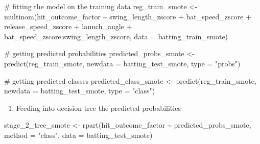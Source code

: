 \documentclass[
  letterpaper,
  DIV=11,
  numbers=noendperiod]{scrartcl}
\newenvironment{Shaded}{\begin{snugshade}}{\end{snugshade}}
\newcommand{\AttributeTok}[1]{\textcolor[rgb]{0.40,0.45,0.13}{#1}}
\newcommand{\CommentTok}[1]{\textcolor[rgb]{0.37,0.37,0.37}{#1}}
\newcommand{\FunctionTok}[1]{\textcolor[rgb]{0.28,0.35,0.67}{#1}}
\newcommand{\NormalTok}[1]{\textcolor[rgb]{0.00,0.23,0.31}{#1}}
\newcommand{\OtherTok}[1]{\textcolor[rgb]{0.00,0.23,0.31}{#1}}
\newcommand{\SpecialCharTok}[1]{\textcolor[rgb]{0.37,0.37,0.37}{#1}}
\newcommand{\StringTok}[1]{\textcolor[rgb]{0.13,0.47,0.30}{#1}}
\providecommand{\tightlist}{%
  \setlength{\itemsep}{0pt}\setlength{\parskip}{0pt}}\usepackage{longtable,booktabs,array}
\begin{document}
\begin{Shaded}
\begin{Highlighting}[]
\CommentTok{\# fitting the model on the training data }
\NormalTok{reg\_train\_smote }\OtherTok{\textless{}{-}} \FunctionTok{multinom}\NormalTok{(hit\_outcome\_factor }\SpecialCharTok{\textasciitilde{}}
\NormalTok{                          swing\_length\_zscore }\SpecialCharTok{+}
\NormalTok{                          bat\_speed\_zscore }\SpecialCharTok{+}
\NormalTok{                          release\_speed\_zscore }\SpecialCharTok{+}
\NormalTok{                          launch\_angle }\SpecialCharTok{+}
\NormalTok{                          bat\_speed\_zscore}\SpecialCharTok{:}\NormalTok{swing\_length\_zscore,}
                        \AttributeTok{data =}\NormalTok{ batting\_train\_smote)}

\CommentTok{\# getting predicted probabilities }
\NormalTok{predicted\_probs\_smote }\OtherTok{\textless{}{-}} \FunctionTok{predict}\NormalTok{(reg\_train\_smote,}
                                 \AttributeTok{newdata =}\NormalTok{ batting\_test\_smote,}
                                 \AttributeTok{type =} \StringTok{"probs"}\NormalTok{)}

\CommentTok{\# getting predicted classes }
\NormalTok{predicted\_class\_smote }\OtherTok{\textless{}{-}} \FunctionTok{predict}\NormalTok{(reg\_train\_smote,}
                                      \AttributeTok{newdata =}\NormalTok{ batting\_test\_smote,}
                                      \AttributeTok{type =} \StringTok{"class"}\NormalTok{)}
\end{Highlighting}
\end{Shaded}

\begin{enumerate}
\def\labelenumi{\arabic{enumi}.}
\setcounter{enumi}{2}
\tightlist
\item
  Feeding into decision tree the predicted probabilities
\end{enumerate}

\begin{Shaded}
\begin{Highlighting}[]
\NormalTok{stage\_2\_tree\_smote }\OtherTok{\textless{}{-}} \FunctionTok{rpart}\NormalTok{(hit\_outcome\_factor }\SpecialCharTok{\textasciitilde{}}
\NormalTok{                              predicted\_probs\_smote,}
                            \AttributeTok{method =} \StringTok{"class"}\NormalTok{,}
                            \AttributeTok{data =}\NormalTok{ batting\_test\_smote)}
\end{Highlighting}
\end{Shaded}
\end{document}
